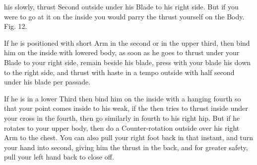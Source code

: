 \newpage


\newpage



his slowly, thrust Second outside under his Blade to his right
side. But if you were to go at it on the inside you would parry the
thrust yourself on the Body. Fig. 12.

\exercise{}

If he is positioned with short Arm in the second or in the upper third, then bind him on the inside with lowered body, as soon as he goes to thrust under your Blade to your right side, remain beside his blade, press with your blade his down to the right side, and thrust with haste in a tempo outside with half second under his blade per passade.

\exercise{}


If he is in a lower Third then bind him on the inside with a hanging fourth so that your point comes inside to his weak, if the then tries to thrust inside under your cross in the fourth, then go similarly in fourth to his right hip. But if he rotates to your upper body, then do a Counter-rotation outside over his right Arm to the chest. You can also pull your right foot back in that instant, and turn your hand into second, giving him the thrust in the back, and for greater safety, pull your left hand back to close off.

